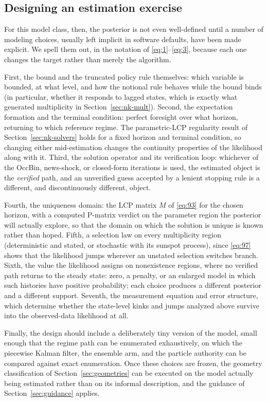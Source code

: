 \documentclass[11pt]{article}
\begin{document}
\subsection{Designing an estimation exercise}
\label{sec:nk-design}

For this model class, then, the posterior is not
even well-defined until a number of modeling choices, usually left implicit
in software defaults, have been made explicit. We spell them
out, in the notation of \eqref{eq:1}--\eqref{eq:3}, because each one changes
the target rather than merely the algorithm.

First, the bound and the truncated policy rule themselves: which variable is
bounded, at what level, and how the notional rule behaves while the bound
binds (in particular, whether it responds to lagged states, which is exactly
what generated multiplicity in Section~\ref{sec:nk-mult}). Second, the expectation
formation and the terminal condition: perfect foresight over what horizon,
returning to which reference regime. The parametric-LCP regularity result of
Section~\ref{sec:nk-solvers} holds for a fixed horizon and terminal condition,
so changing either mid-estimation changes the continuity properties
of the likelihood along with it. Third, the solution operator and its verification loop:
whichever of the OccBin, news-shock, or closed-form iterations is used, the
estimated object is the \emph{verified} path, and an unverified guess accepted
by a lenient stopping rule is a different, and discontinuously different,
object.

Fourth, the uniqueness domain: the LCP matrix $M$ of \eqref{eq:93} for the
chosen horizon, with a computed P-matrix verdict on the parameter region the
posterior will actually explore, so that the domain on which the solution is
unique is known rather than hoped. Fifth, a selection law on every
multiplicity region (deterministic and stated, or stochastic with its
sunspot process), since \eqref{eq:97} shows that the likelihood jumps
wherever an unstated selection switches branch. Sixth, the value the
likelihood assigns on nonexistence regions, where no verified path returns to
the steady state: zero, a penalty, or an enlarged model in which such
histories have positive probability; each choice produces a different
posterior and a different support. Seventh, the measurement equation and error
structure, which determine whether the state-level kinks and jumps analyzed
above survive into the observed-data likelihood at all.

Finally, the design should include a deliberately tiny version of the model,
small enough that the regime path can be enumerated exhaustively,
on which the piecewise Kalman filter, the ensemble arm, and the particle
authority can be compared against exact enumeration. Once these choices are
frozen, the geometry classification of Section~\ref{sec:geometries} can be executed on
the model actually being estimated rather than on its informal description,
and the guidance of Section~\ref{sec:guidance} applies.
\end{document}
